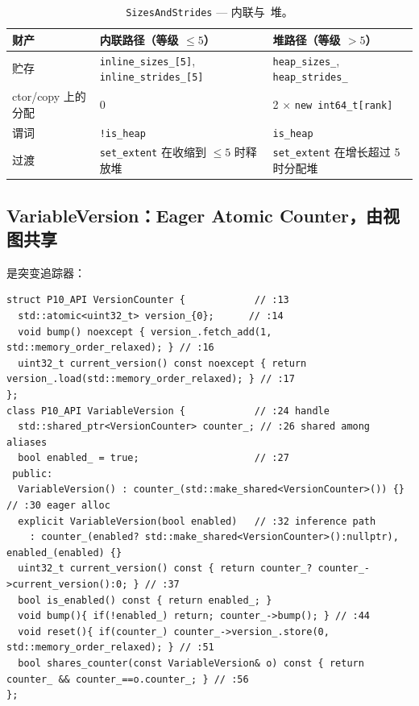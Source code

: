 \begin{table}[H]
\centering
\caption{\texttt{SizesAndStrides} --- 内联与\ 堆。}
\label{tab:sizesinline}
\small
\begin{tabular}{lll}
\toprule
财产 & 内联路径（等级 $\le 5$） & 堆路径（等级 $>5$） \\
\midrule
贮存 & \texttt{inline\_sizes\_[5]}, \texttt{inline\_strides\_[5]} & \texttt{heap\_sizes\_}, \texttt{heap\_strides\_} \\
ctor/copy 上的分配 & 0 & 2 $\times$ \texttt{new int64\_t[rank]} \\
谓词 & \texttt{!is\_heap} & \texttt{is\_heap} \\
过渡 & \texttt{set\_extent} 在收缩到 $\le 5$ 时释放堆 & \texttt{set\_extent} 在增长超过 5 时分配堆 \\
\bottomrule
\end{tabular}
\end{table}

\subsection{VariableVersion：Eager Atomic Counter，由视图共享}
\label{sec:version}

是突变追踪器：

\begin{lstlisting}[caption={eager atomic counter.}, label=lst:varversion]
struct P10_API VersionCounter {            // :13
  std::atomic<uint32_t> version_{0};      // :14
  void bump() noexcept { version_.fetch_add(1, std::memory_order_relaxed); } // :16
  uint32_t current_version() const noexcept { return version_.load(std::memory_order_relaxed); } // :17
};
class P10_API VariableVersion {            // :24 handle
  std::shared_ptr<VersionCounter> counter_; // :26 shared among aliases
  bool enabled_ = true;                    // :27
 public:
  VariableVersion() : counter_(std::make_shared<VersionCounter>()) {} // :30 eager alloc
  explicit VariableVersion(bool enabled)   // :32 inference path
    : counter_(enabled? std::make_shared<VersionCounter>():nullptr), enabled_(enabled) {}
  uint32_t current_version() const { return counter_? counter_->current_version():0; } // :37
  bool is_enabled() const { return enabled_; }
  void bump(){ if(!enabled_) return; counter_->bump(); } // :44
  void reset(){ if(counter_) counter_->version_.store(0, std::memory_order_relaxed); } // :51
  bool shares_counter(const VariableVersion& o) const { return counter_ && counter_==o.counter_; } // :56
};
\end{lstlisting}

